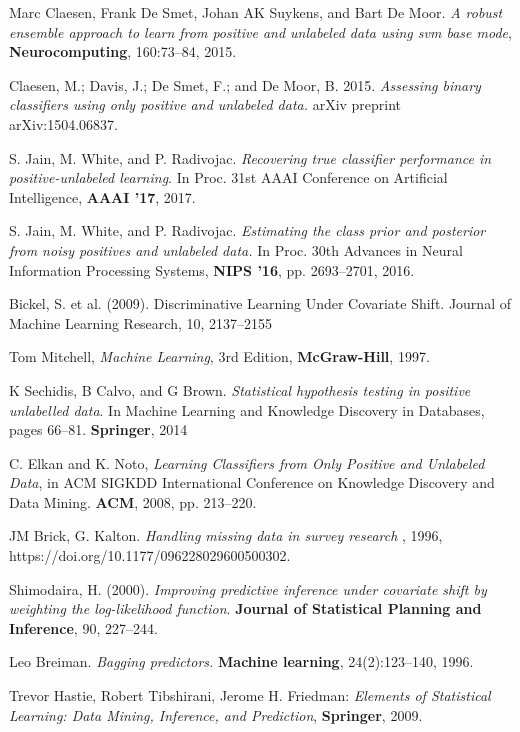 \begin{thebibliography}{9}
Marc Claesen, Frank De Smet, Johan AK Suykens, and Bart De Moor. \textit{A robust ensemble approach to learn from positive and unlabeled data using svm base mode}, \textbf{Neurocomputing}, 160:73–84, 2015.

Claesen, M.; Davis, J.; De Smet, F.; and De Moor, B. 2015. \textit{Assessing binary classifiers using only positive and unlabeled data.} arXiv preprint arXiv:1504.06837.

S. Jain, M. White, and P. Radivojac. \textit{Recovering true classifier performance in positive-unlabeled learning}. In Proc. 31st AAAI Conference on Artificial Intelligence, \textbf{AAAI '17}, 2017.

S. Jain, M. White, and P. Radivojac. \textit{Estimating the class prior and posterior from noisy positives and unlabeled data.} In Proc. 30th Advances in Neural Information Processing Systems, \textbf{NIPS '16}, pp. 2693–2701, 2016.

Bickel, S. et al. (2009). Discriminative Learning Under Covariate Shift. Journal of Machine Learning Research, 10, 2137–2155

Tom Mitchell, \textit{Machine Learning}, 3rd Edition, \textbf{McGraw-Hill}, 1997.

K Sechidis, B Calvo, and G Brown. \textit{Statistical hypothesis testing in positive unlabelled data}. In Machine Learning and Knowledge Discovery in Databases, pages 66–81. \textbf{Springer}, 2014

C. Elkan and K. Noto, \textit{Learning Classifiers from Only Positive and Unlabeled Data}, in ACM SIGKDD International Conference on Knowledge Discovery and Data Mining. \textbf{ACM}, 2008, pp. 213–220.

JM Brick, G. Kalton. \textit{Handling missing data in survey research }, 1996, https://doi.org/10.1177/096228029600500302.

Shimodaira, H. (2000). \textit{Improving predictive inference under covariate shift by weighting the log-likelihood function}. \textbf{Journal of Statistical Planning and Inference}, 90, 227–244.

Leo Breiman. \textit{Bagging predictors.} \textbf{Machine learning}, 24(2):123–140, 1996.

Trevor Hastie, Robert Tibshirani, Jerome H. Friedman: \textit{Elements of Statistical Learning: Data Mining, Inference, and Prediction}, \textbf{Springer}, 2009.


\end{thebibliography}

